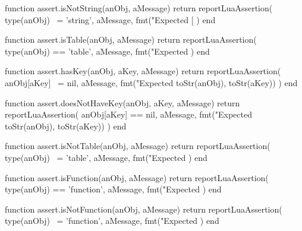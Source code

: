 \stopTestSuite


\startLuaCode
function assert.isNotString(anObj, aMessage)
  return reportLuaAssertion(
    type(anObj) ~= 'string',
    aMessage,
    fmt("Expected [%
  )
end
\stopLuaCode

\stopTestSuite


\startLuaCode
function assert.isTable(anObj, aMessage)
  return reportLuaAssertion(
    type(anObj) == 'table',
    aMessage,
    fmt("Expected %
  )
end
\stopLuaCode

\stopTestSuite


\startLuaCode
function assert.hasKey(anObj, aKey, aMessage)
  return reportLuaAssertion(
    anObj[aKey] ~= nil,
    aMessage,
    fmt("Expected %
      toStr(anObj), toStr(aKey))
  )
end
\stopLuaCode

\stopTestSuite


\startLuaCode
function assert.doesNotHaveKey(anObj, aKey, aMessage)
  return reportLuaAssertion(
    anObj[aKey] == nil,
    aMessage,
    fmt("Expected %
      toStr(anObj), toStr(aKey))
  )
end
\stopLuaCode

\stopTestSuite


\startLuaCode
function assert.isNotTable(anObj, aMessage)
  return reportLuaAssertion(
    type(anObj) ~= 'table',
    aMessage,
    fmt("Expected %
  )
end
\stopLuaCode

\stopTestSuite


\startLuaCode
function assert.isFunction(anObj, aMessage)
  return reportLuaAssertion(
    type(anObj) == 'function',
    aMessage,
    fmt("Expected %
  )
end
\stopLuaCode

\stopTestSuite


\startLuaCode
function assert.isNotFunction(anObj, aMessage)
  return reportLuaAssertion(
    type(anObj) ~= 'function',
    aMessage,
    fmt("Expected %
  )
end
\stopLuaCode

